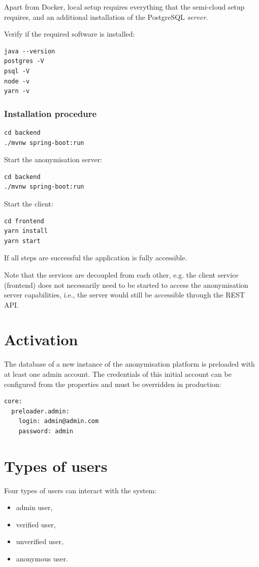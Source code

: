 \documentclass[a4paper,twoside,12pt]{book}
\begin{document}
Apart from Docker, local setup requires everything that the semi-cloud setup requires, and an additional installation of the PostgreSQL \textit{server}.

Verify if the required software is installed:
\begin{verbatim}
java --version
postgres -V
psql -V
node -v
yarn -v
\end{verbatim}

\subsubsection{Installation procedure}

\begin{verbatim}
cd backend
./mvnw spring-boot:run
\end{verbatim}

Start the anonymisation server:
\begin{verbatim}
cd backend
./mvnw spring-boot:run
\end{verbatim}

Start the client:
\begin{verbatim}
cd frontend
yarn install
yarn start
\end{verbatim}

If all steps are successful the application is fully accessible.

Note that the services are decoupled from each other, e.g. the client service (frontend) does not necessarily need to be started to access the anonymisation server capabilities, i.e., the server would still be accessible through the REST API.

\section{Activation}

The database of a new instance of the anonymisation platform is preloaded with at least one admin account. The credentials of this initial account can be configured from the properties and must be overridden in production:
\begin{verbatim}
core:
  preloader.admin:
    login: admin@admin.com
    password: admin
\end{verbatim}


\section{Types of users}

Four types of users can interact with the system:
\begin{itemize}
\item admin user,
\item verified user,
\item unverified user,
\item anonymous user.
\end{itemize}
\end{document}
